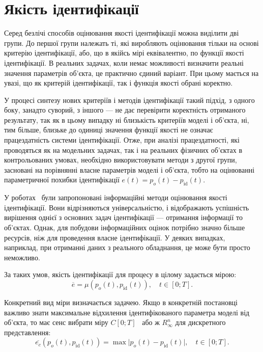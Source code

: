 \section{Якість ідентифікації}%

Серед безлічі способів оцінювання якості ідентифікації можна
виділити дві групи. До першої групи належать ті, які виробляють
оцінювання тільки на основі критерію ідентифікації, або, що в
якійсь мірі еквівалентно, по функції якості ідентифікації. В
реальних задачах, коли немає можливості визначити реальні
значення параметрів об'єкта, це практично єдиний варіант. При
цьому мається на увазі, що як критерій ідентифікації, так і
функція якості обрані коректно.

У процесі синтезу нових критеріїв і методів ідентифікації
такий підхід, з одного боку, занадто суворий, з іншого --- не
дає перевірити коректність отриманого результату, так як в
цьому випадку ні близькість критеріїв моделі і об'єкта, ні, тим
більше, близьке до одиниці значення функції якості не означає
працездатність системи ідентифікації. Отже, при аналізі
працездатності, які проводяться як на модельних задачах,
так і на реальних фізичних об'єктах в контрольованих умовах,
необхідно використовувати методи з другої групи, засновані
на порівнянні власне параметрів моделі і об'єкта, тобто на
оцінюванні параметричної похибки ідентифікації
$e(t) = p_o(t) - p_\mathrm{id}(t)$.

У роботах~\cite{info_cipkin, straton_inf, atu_phd_thesis, karabut} були запропоновані
інформаційні методи оцінювання якості ідентифікації. Вони
відрізняються універсальністю, і відображають успішність
вирішення однієї з основних задач ідентифікації --- отримання
інформації то об'єктах. Однак, для побудови інформаційних оцінок
потрібно значно більше ресурсів, ніж для проведення власне
ідентифікації. У деяких випадках, наприклад, при отриманні
даних з реального обладнання, це може бути просто неможливо.



За таких умов,
якість ідентифікації для процесу в цілому задається мірою:
%
\[
  \overline{e} = \mu( p_o(t), p_\mathrm{id}(t) ),
  \quad
  t \in [0;T].
\]

Конкретний вид міри визначається задачею. Якщо в конкретній постановці
важливо знати максимальне відхилення ідентифікованого параметра моделі від
об'єкта, то має сенс вибрати міру $C[0; T]$~\cite{kolmogorov_fun_ana} або ж $ R_{\infty}^n$ для
дискретного представлення:
%
\begin{equation}
  \overline{e_c}(p_o(t),p_\mathrm{id}(t))
  =
  \max \big| p_o(t)-p_\mathrm{id}(t) \big|,
  \quad
  t \in [0;T].
  \label{atu:eq:e_c}
\end{equation}

